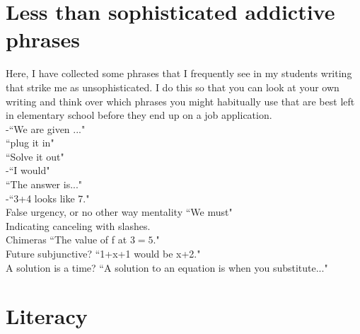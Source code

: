 \documentclass[12pt]{article}
\def\noi{\noindent}
\begin{document}
%




\section{Less than sophisticated addictive phrases}
Here, I have collected some phrases that I frequently see in my students writing that strike me as unsophisticated. 
I do this so that you can look at your own writing and think over which phrases you might habitually use that are best left in elementary school before they end up on a job application. 
\\[1cm]

\noindent 
-``We are given ..."\\
``plug it in"\\
``Solve it out"\\
-``I would" \\
``The answer is..."\\
-``3+4 looks like 7."\\
False urgency, or no other way mentality ``We must"\\
Indicating canceling with slashes.\\
Chimeras ``The value of f at $3= 5$."\\
Future subjunctive? ``1+x+1 would be x+2." \\
A solution is a time? ``A solution to an equation is when you substitute..."  \\ 



\section{Literacy }


%
%
\end{document}
